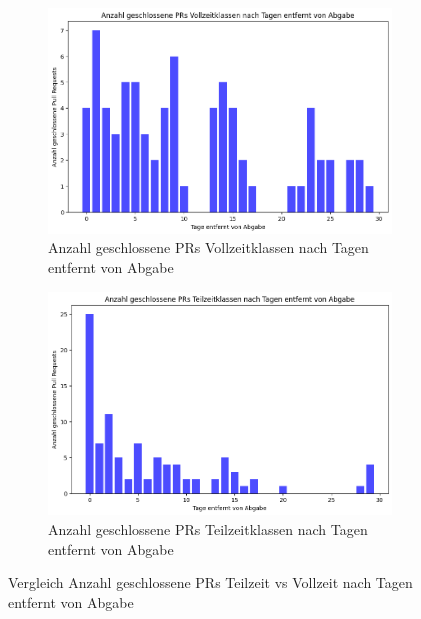 \begin{figure}[htbp]
    \centering
    \begin{subfigure}[b]{0.48\textwidth}
        \centering
        \includegraphics[width=\textwidth]{Figures/closed-prs-projektzeit-vollzeit.png}
        \caption{Anzahl geschlossene PRs Vollzeitklassen nach Tagen entfernt von Abgabe}
        \label{fig:closed-prs-projektkeit-vollzeit}
    \end{subfigure}
    \hfill
    \begin{subfigure}[b]{0.48\textwidth}
        \centering
        \includegraphics[width=\textwidth]{Figures/closed-prs-projektzeit-teilzeit.png}
         \caption{Anzahl geschlossene PRs Teilzeitklassen nach Tagen entfernt von Abgabe}
        \label{fig:closed-prs-projektkeit-teilzeit}
    \end{subfigure}
    \caption{Vergleich Anzahl geschlossene PRs Teilzeit vs Vollzeit nach Tagen entfernt von Abgabe}
    \label{fig:vergleich-latency-churn-projektzeit}
\end{figure}



